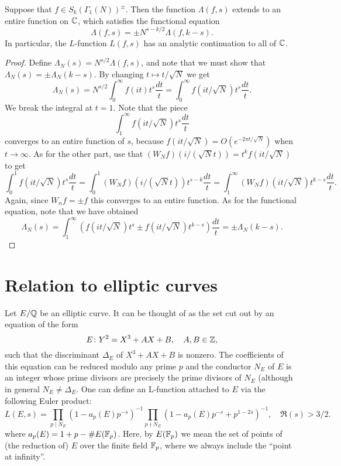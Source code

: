 \begin{theorem}
Suppose that $f\in S_k(\Gamma_1(N))^\pm$. Then the function $\Lambda(f,s)$ extends to an entire function on $\mathbb{C}$, which satisfies the functional equation
\[
\Lambda(f,s)=\pm N^{s-k/2}\Lambda(f,k-s).
\]
In particular, the $L$-function $L(f,s)$ has an analytic continuation to all of $\mathbb{C}$.
\end{theorem}
\begin{proof}
Define $\Lambda_N(s)=N^{s/2}\Lambda(f,s)$, and note that we must show that $\Lambda_N(s) = \pm \Lambda_N(k-s)$. By changing $t\mapsto t/\sqrt{N}$ we get
\[
\Lambda_N(s)=N^{s/2}\int_0^\infty f(it)t^s\frac{dt}{t} = \int_0^\infty f(it/\sqrt{N}) t^s\frac{dt}{t}.
\]
We break the integral at $t=1$. Note that the piece
\[
\int_1^\infty f(it/\sqrt{N}) t^s\frac{dt}{t}
\]
converges to an entire function of $s$, because $f(it/\sqrt{N})=O(e^{-2\pi t/\sqrt{N}})$ when $t\to \infty$. As for the other part, use that $(W_Nf)(i/(\sqrt N t)) = t^k f(it/\sqrt{N})$ to get
\[
\int_0^1 f(it/\sqrt{N}) t^s\frac{dt}{t} = \int_0^1 (W_Nf)(i/(\sqrt{N}t)) t^{s-k}\frac{dt}{t} = \int_1^\infty (W_Nf)(it/\sqrt{N})t^{k-s}\frac{dt}{t}.
\]
Again, since $W_nf = \pm f$ this converges to an entire function. As for the functional equation, note that we have obtained
\[
\Lambda_N(s) = \int_1^\infty\left(f(it/\sqrt{N})t^s \pm f(it/\sqrt{N})t^{k-s}\right)\frac{dt}{t} = \pm\Lambda_N(k-s).
\]
\end{proof}

\section{Relation to elliptic curves}

Let $E/\mathbb{Q}$ be an elliptic curve. It can be thought of as the set cut out by an equation of the form
\[
E\colon Y^2 = X^3+AX+B,\quad A,B\in\mathbb{Z},
\]
such that the discriminant $\Delta_E$ of $X^3+AX+B$ is nonzero. The coefficients of this equation can be reduced modulo any prime $p$ and the conductor $N_E$ of $E$ is an integer whose prime divisors are precisely the prime divisors of $N_E$ (although in general $N_E\neq \Delta_E$. One can define an L-function attached to $E$ via the following Euler product:
\[
L(E,s)=\prod_{p\mid N_E}(1-a_p(E)p^{-s})^{-1} \prod_{p\nmid N_E} (1-a_p(E)p^{-s} + p^{1-2s})^{-1},\quad \Re(s)>3/2.
\]
where $a_p(E) = 1+p-\# E(\mathbb{F}_p)$. Here, by $E(\mathbb{F}_p)$ we mean the set of points of (the reduction of) $E$ over the finite field $\mathbb{F}_p$, where we always include the ``point at infinity''.

